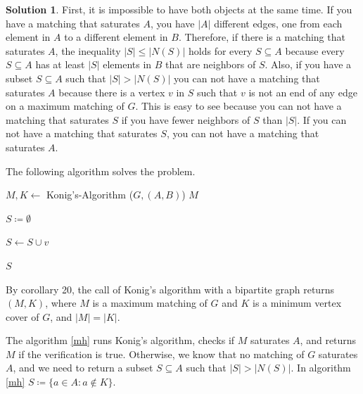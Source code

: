 \documentclass[11pt,leqno,final]{amsart}
\theoremstyle{definition}
\newtheorem{solution}{Solution}
\begin{document}
\begin{solution}
  First, it is impossible to have both objects at the same time. If you have a matching that saturates $A$, you have $|A|$ different edges, one from each element in $A$ to a different element in $B$. Therefore, if there is a matching that saturates $A$, the inequality $|S| \leq |N (S)|$ holds for every $S \subseteq A$ because every $S \subseteq A$ has at least $|S|$ elements in $B$ that are neighbors of $S$. Also, if you have a subset $S \subseteq A$ such that $|S| > |N (S)|$ you can not have a matching that saturates $A$ because there is a vertex $v$ in $S$ such that $v$ is not an end of any edge on a maximum matching of $G$. This is easy to see because you can not have a matching that saturates $S$ if you have fewer neighbors of $S$ than $|S|$. If you can not have a matching that saturates $S$, you can not have a matching that saturates $A$.  
  
  The following algorithm solves the problem.

  
  \begin{algorithm}
    \caption{Matching-or-Hall-Set ($G, (A, B)$)}\label{mh}
    \begin{algorithmic}[1]
      \State $M,K \gets$ Konig's-Algorithm ($G,(A,B)$)
        \State \Return $M$ 
      \EndIf

      \State $S \coloneqq \emptyset$

          \State $S \gets S \cup v$ 

        \EndIf
      \EndFor
      \State \Return $S$

    \end{algorithmic}
  \end{algorithm}

  By corollary 20, the call of Konig's algorithm with a bipartite graph returns $(M,K)$, where $M$ is a maximum matching of $G$ and $K$ is a minimum vertex cover of $G$, and $|M| = |K|$.

  The algorithm \ref{mh} runs Konig's algorithm, checks if $M$ saturates $A$, and returns $M$ if the verification is true. Otherwise, we know that no matching of $G$ saturates $A$, and we need to return a subset $S \subseteq A$ such that $|S| > |N (S)|$. In algorithm \ref{mh} $S \coloneqq \{a \in A: a \notin K\}$.
  

\end{solution}
\end{document}
